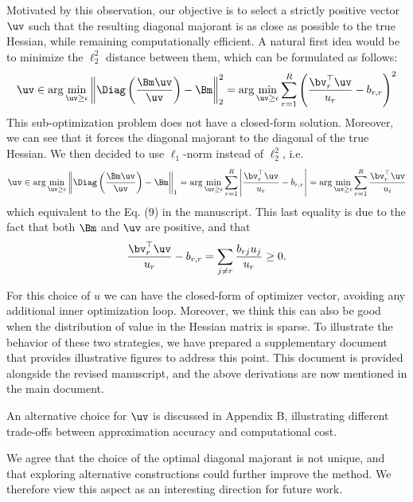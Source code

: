 \documentclass[10pt]{article} %
\begin{document}
{Motivated by this observation, our objective is to select a strictly positive vector $\uv$ such that the resulting diagonal majorant is as close as possible to the true Hessian, while remaining computationally efficient. A natural first idea would be to minimize the $\ell_2^2$ distance between them, which can be formulated as follows:
\begin{equation}\label{eq:1}
    \uv \in \arg\min_{\uv \geq \epsilon}  \left\| \Diag\left(\frac{\Bm \uv}{\uv}\right) - \Bm\right\|_2^2 = \arg\min_{\uv \geq \epsilon}  \sum_{r = 1}^R \left( \frac{\bv_r^\top \uv}{u_r} - b_{r,r}\right)^2 
\end{equation}
This sub-optimization problem does not have a closed-form solution. Moreover, we can see that it forces the diagonal majorant to the diagonal of the true Hessian.
We then decided to use $\ell_1$-norm instead of $\ell_2^2$, i.e.
\begin{equation}\label{eq:2}
    \uv \in \arg\min_{\uv \geq \epsilon}    \left\| \Diag\left(\frac{\Bm \uv}{\uv}\right) - \Bm\right\|_1 = \arg\min_{\uv \geq \epsilon}  \sum_{r = 1}^R \left| \frac{\bv_r^\top \uv}{u_r} - b_{r,r}\right|  = \arg\min_{\uv \geq \epsilon} \sum_{r = 1}^R \frac{\bv_r^\top \uv}{u_i}
\end{equation}
which equivalent to the Eq. (9) in the manuscript. This last equality is due to the fact that both $\Bm$ and $\uv$ are positive, and that 
$$\frac{\bv_r^\top \uv}{u_r} - b_{r,r} = \sum_{j\neq r} \frac{b_{rj}u_j}{u_r} \geq 0.$$

For this choice of $u$ we can have the closed-form of optimizer vector, avoiding any additional inner optimization loop. Moreover, we think this can also be good when the distribution of value in the Hessian matrix is sparse. To illustrate the behavior of these two strategies, we have prepared a supplementary document that provides illustrative figures to address this point. This document is provided alongside the revised manuscript, and the above derivations are now mentioned in the main document.

An alternative choice for $\uv$ is discussed in Appendix B, illustrating different trade-offs between approximation accuracy and computational cost.

We agree that the choice of the optimal diagonal majorant is not unique, and that exploring alternative constructions could further improve the method. We therefore view this aspect as an interesting direction for future work. 

}
\end{document}
